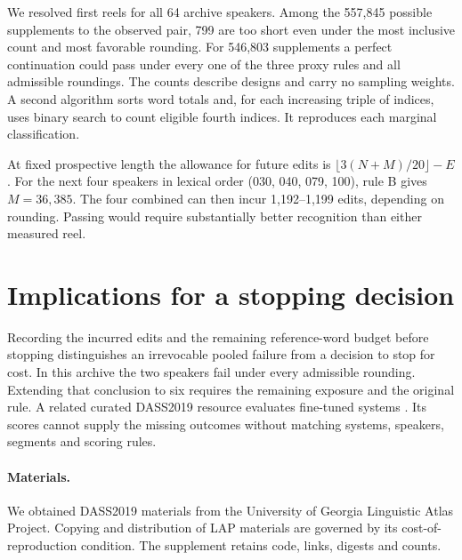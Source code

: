 \documentclass[11pt]{article}
\begin{document}
We resolved first reels for all 64 archive speakers. Among the 557,845 possible supplements to the observed pair, 799 are too short even under the most inclusive count and most favorable rounding. For 546,803 supplements a perfect continuation could pass under every one of the three proxy rules and all admissible roundings. The counts describe designs and carry no sampling weights. A second algorithm sorts word totals and, for each increasing triple of indices, uses binary search to count eligible fourth indices. It reproduces each marginal classification.

At fixed prospective length the allowance for future edits is $\lfloor3(N+M)/20\rfloor-E$. For the next four speakers in lexical order (030, 040, 079, 100), rule B gives $M=36{,}385$. The four combined can then incur 1,192--1,199 edits, depending on rounding. Passing would require substantially better recognition than either measured reel.
\section{Implications for a stopping decision}
Recording the incurred edits and the remaining reference-word budget before stopping distinguishes an irrevocable pooled failure from a decision to stop for cost. In this archive the two speakers fail under every admissible rounding. Extending that conclusion to six requires the remaining exposure and the original rule. A related curated DASS2019 resource evaluates fine-tuned systems \cite{coats}. Its scores cannot supply the missing outcomes without matching systems, speakers, segments and scoring rules.

\paragraph{Materials.} We obtained DASS2019 materials from the University of Georgia Linguistic Atlas Project. Copying and distribution of LAP materials are governed by its cost-of-reproduction condition. The supplement retains code, links, digests and counts.
\end{document}
